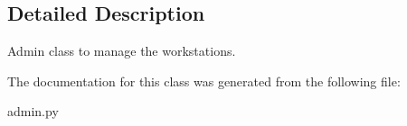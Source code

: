 \subsection{Detailed Description}
Admin class to manage the workstations. 



The documentation for this class was generated from the following file\+:\begin{DoxyCompactItemize}
\item 
admin.\+py\end{DoxyCompactItemize}

